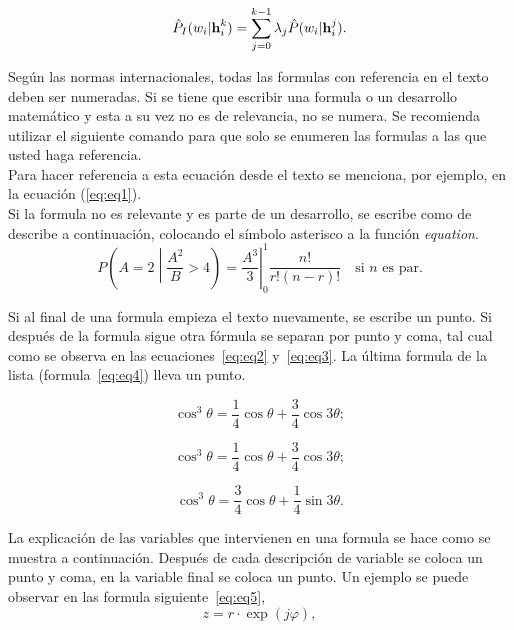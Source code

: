 \documentclass[
10pt,			%
letterpaper,	%
oneside,		%
headinclude, footinclude, %
BCOR5mm, 		%
]{scrartcl}
\begin{document}
\begin{equation}
\hat {P}_I (w_i \vert \textrm{{\textbf{h}}}_i^k ) = \sum\limits_{j=0}^{k-1} 
{\lambda _j \hat {P}(w_i \vert \textrm{{\textbf{h}}}_i^j ).} 
\label{eq:eq1}
\end{equation}

Según las normas internacionales, todas las formulas con referencia en el texto deben ser numeradas. Si se tiene que escribir una formula o un desarrollo matemático y esta a su vez no es de relevancia, no se numera. Se recomienda utilizar el siguiente comando para que solo se enumeren las formulas a las que usted haga referencia.\\
Para hacer referencia a esta ecuación desde el texto se menciona, por ejemplo, en la ecuación (\ref{eq:eq1}).\\
Si la formula no es relevante y es parte de un desarrollo, se escribe como de describe a continuación, colocando el símbolo asterisco a la función \textit{equation}.
\begin{equation*}
P\left(A=2\middle|\frac{A^2}{B}>4\right)=\left.\frac{A^3}{3}\right|_0^1 \frac{n!}{r!(n-r)!} \quad \text{si $n$ es par}.
\end{equation*}

Si al final de una formula empieza el texto nuevamente, se escribe un punto. Si después de la formula sigue otra fórmula se separan por punto y coma, tal cual como se observa en las ecuaciones~\ref{eq:eq2} y~\ref{eq:eq3}. La última formula de la lista (formula~\ref{eq:eq4}) lleva un punto.

\begin{equation}
\cos^3 \theta =\frac{1}{4}\cos\theta+\frac{3}{4}\cos 3\theta;
\label{eq:eq2}
\end{equation}

\begin{equation}
\cos^3 \theta =\frac{1}{4}\cos\theta+\frac{3}{4}\cos 3\theta;
\label{eq:eq3}
\end{equation}

\begin{equation}
\cos^3 \theta =\frac{3}{4}\cos\theta+\frac{1}{4}\sin 3\theta.
\label{eq:eq4}
\end{equation}

La explicación de las variables que intervienen en una formula se hace como se muestra a continuación. Después de cada descripción de variable se coloca un punto y coma, en la variable final se coloca un punto. Un ejemplo se puede observar en las formula siguiente~\ref{eq:eq5},
\begin{equation}
z = r\cdot\exp\left({j\varphi}\right),
\label{eq:eq5}
\end{equation}
\end{document}
